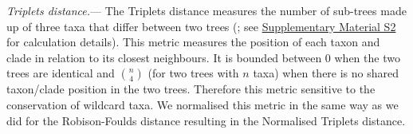 \documentclass[12pt,letterpaper]{article}
\renewcommand{\subsubsection}[1]{%
\vspace{2ex}
\noindent
\textit{#1.}---}
\begin{document}
\subsubsection{Triplets distance}
The Triplets distance \citep{dobson1975triplets} measures the number of sub-trees made up of three taxa that differ between two trees (\citealt{critchlowthe1996}; see \hyperref[SupplementaryMaterial]{Supplementary Material S2} for calculation details). This metric measures the position of each taxon and clade in relation to its closest neighbours. It is bounded between 0 when the two trees are identical and $\binom{n}{4}$ (for two trees with $n$ taxa) when there is no shared taxon/clade position in the two trees. Therefore this metric sensitive to the conservation of wildcard taxa. We normalised this metric in the same way as we did for the Robison-Foulds distance resulting in the Normalised Triplets distance.

\end{document}
